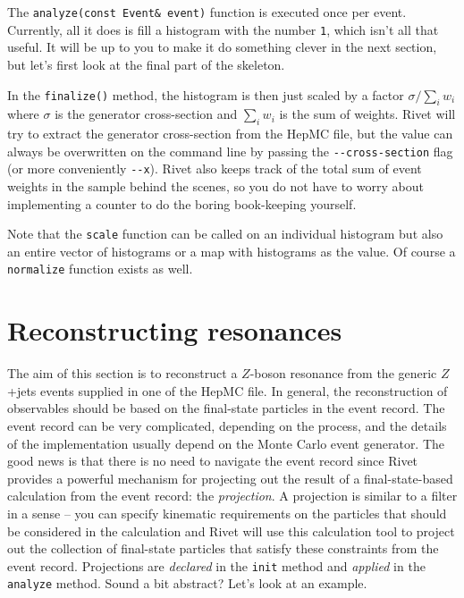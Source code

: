 \documentclass[10pt,fleqn]{scrartcl}
\theoremstyle{exstyle}
\begin{document}
The \verb|analyze(const Event& event)| function is executed once per event.
Currently, all it does is fill a histogram with the number \verb|1|, which
isn't all that useful. It will be up to you to make it do something clever
in the next section, but let's first look at the final part of the skeleton.

In the \verb|finalize()| method, the histogram is then just scaled by a factor 
$\sigma/\sum_i w_i$ where $\sigma$ is the generator cross-section and 
$\sum_i w_i$ is the sum of weights. 
Rivet will try to extract the generator cross-section from the HepMC file,
but the value can always be overwritten on the command line by passing
the \verb|--cross-section| flag (or more conveniently \verb|--x|).
Rivet also keeps track of the total sum of event weights in the sample
behind the scenes, so you do not have to worry about implementing a counter
to do the boring book-keeping yourself.

Note that the \verb|scale| function can be called on an individual histogram
but also an entire vector of histograms or a map with histograms as the value.
Of course a \verb|normalize| function exists as well.


\section{Reconstructing resonances}

The aim of this section is to reconstruct a $Z$-boson resonance from the 
generic $Z$+jets events supplied in one of the HepMC file. In general,
the reconstruction of observables should be based on the
final-state particles in the event record. The event record can 
be very complicated, depending on the process, and the details of the 
implementation usually depend on the Monte Carlo event generator.
The good news is that there is no need to navigate the event record 
since Rivet provides a powerful mechanism for projecting out 
the result of a final-state-based calculation 
from the event record: the \emph{projection}. 
A projection is similar to a filter in a sense -- you can specify kinematic
requirements on the particles that should be considered in the calculation 
and Rivet will use this calculation tool to project out 
the collection of final-state particles that satisfy these constraints
from the event record.
Projections are \emph{declared} in the \verb|init| method and
\emph{applied} in the \verb|analyze| method. 
Sound a bit abstract? Let's look at an example.
\end{document}
